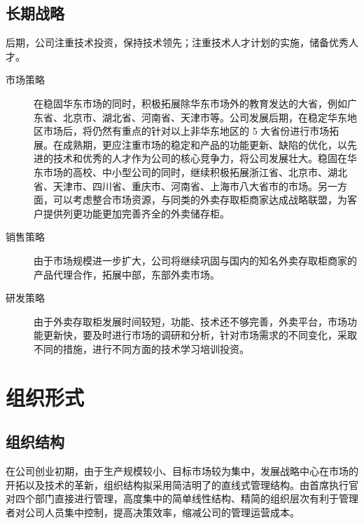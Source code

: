 \documentclass[violet]{main}
\begin{document}
			\subsection{长期战略}
				后期，公司注重技术投资，保持技术领先；注重技术人才计划的实施，储备优秀人才。
				\begin{description}
					\item[市场策略]在稳固华东市场的同时，积极拓展除华东市场外的教育发达的大省，例如广东省、北京市、湖北省、河南省、天津市等。公司发展后期，在稳定华东地区市场后，将仍然有重点的针对以上非华东地区的 5 大省份进行市场拓展。在成熟期，更应注重市场的稳定和产品的功能更新、缺陷的优化，以先进的技术和优秀的人才作为公司的核心竞争力，将公司发展壮大。稳固在华东市场的高校、中小型公司的同时，继续积极拓展浙江省、北京市、湖北省、天津市、四川省、重庆市、河南省、上海市八大省市的市场。另一方面，可以考虑整合市场资源，与同类的外卖存取柜商家达成战略联盟，为客户提供列更功能更加完善齐全的外卖储存柜。
					\item[销售策略]由于市场规模进一步扩大，公司将继续巩固与国内的知名外卖存取柜商家的产品代理合作，拓展中部，东部外卖市场。
					\item[研发策略]由于外卖存取柜发展时间较短，功能、技术还不够完善，外卖平台，市场功能更新快，要及时进行市场的调研和分析，针对市场需求的不同变化，采取不同的措施，进行不同方面的技术学习培训投资。
				\end{description}
		\section{组织形式}
			\subsection{组织结构}
				\begin{center}
					\Tcbset{}
				\end{center}
				在公司创业初期，由于生产规模较小、目标市场较为集中，发展战略中心在市场的开拓以及技术的革新，组织结构拟采用简洁明了的直线式管理结构。由首席执行官对四个部门直接进行管理，高度集中的简单线性结构、精简的组织层次有利于管理者对公司人员集中控制，提高决策效率，缩减公司的管理运营成本。
\end{document}
